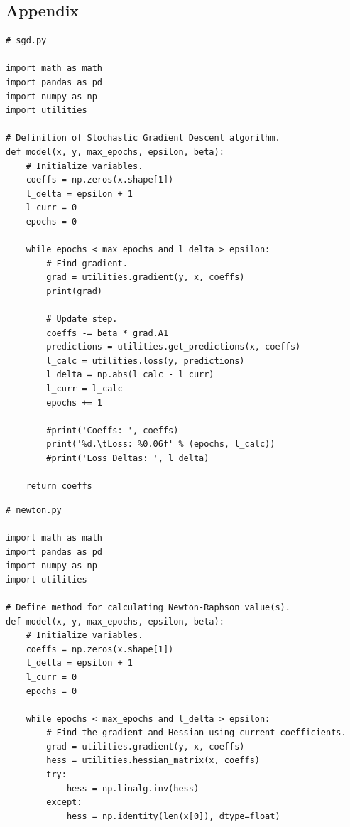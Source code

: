 \documentclass[letterpaper]{article} %
\begin{document}



\onecolumn

\pagebreak

\begin{center}
\section*{Appendix}
\label{app:b}
\end{center}

\bigskip

\footnotesize{
\begin{verbatim}
# sgd.py

import math as math
import pandas as pd
import numpy as np
import utilities

# Definition of Stochastic Gradient Descent algorithm.
def model(x, y, max_epochs, epsilon, beta):
    # Initialize variables.
    coeffs = np.zeros(x.shape[1])
    l_delta = epsilon + 1
    l_curr = 0
    epochs = 0

    while epochs < max_epochs and l_delta > epsilon:
        # Find gradient.
        grad = utilities.gradient(y, x, coeffs)
        print(grad)

        # Update step.
        coeffs -= beta * grad.A1
        predictions = utilities.get_predictions(x, coeffs)
        l_calc = utilities.loss(y, predictions)
        l_delta = np.abs(l_calc - l_curr)
        l_curr = l_calc
        epochs += 1

        #print('Coeffs: ', coeffs)
        print('%d.\tLoss: %0.06f' % (epochs, l_calc))
        #print('Loss Deltas: ', l_delta)

    return coeffs
\end{verbatim}

\bigskip

\begin{verbatim}
# newton.py

import math as math
import pandas as pd
import numpy as np
import utilities

# Define method for calculating Newton-Raphson value(s).
def model(x, y, max_epochs, epsilon, beta):
    # Initialize variables.
    coeffs = np.zeros(x.shape[1])
    l_delta = epsilon + 1
    l_curr = 0
    epochs = 0

    while epochs < max_epochs and l_delta > epsilon:
        # Find the gradient and Hessian using current coefficients.
        grad = utilities.gradient(y, x, coeffs)
        hess = utilities.hessian_matrix(x, coeffs)
        try:
            hess = np.linalg.inv(hess)
        except:
            hess = np.identity(len(x[0]), dtype=float)


\end{verbatim}}
\end{document}
